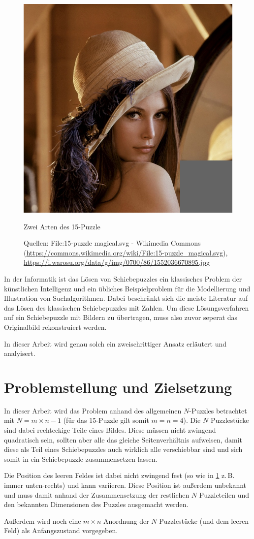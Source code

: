 \documentclass{whswinvcbook}
\begin{document}
\begin{figure}[H]
{        \includegraphics[width=0.25\linewidth]{img/fig-15-puzzle-image-solved.png}
    }
    \caption{Zwei Arten des 15-Puzzle}
    \caption*{Quellen: File:15-puzzle magical.svg - Wikimedia Commons (\url{https://commons.wikimedia.org/wiki/File:15-puzzle_magical.svg}), \url{https://i.warosu.org/data/g/img/0700/86/1552036670895.jpg}}
    \label{fig-15-puzzle}
\end{figure}
In der Informatik ist das Lösen von Schiebepuzzles ein klassisches Problem der künstlichen Intelligenz und ein übliches Beispielproblem für die Modellierung und Illustration von Suchalgorithmen. Dabei beschränkt sich die meiste Literatur auf das Lösen des klassischen Schiebepuzzles mit Zahlen. Um diese Lösungsverfahren auf ein Schiebepuzzle mit Bildern zu übertragen, muss also zuvor seperat das Originalbild rekonstruiert werden.

In dieser Arbeit wird genau solch ein zweischrittiger Ansatz erläutert und analyisert.
\section{Problemstellung und Zielsetzung}
In dieser Arbeit wird das Problem anhand des allgemeinen $N$-Puzzles betrachtet mit $N=m\times n-1$ (für das 15-Puzzle gilt somit $m=n=4$).
Die $N$ Puzzlestücke sind dabei rechteckige Teile eines Bildes. Diese müssen nicht zwingend quadratisch sein, sollten aber alle das gleiche Seitenverhältnis aufweisen, damit diese als Teil eines Schiebepuzzles auch wirklich alle verschiebbar sind und sich somit in ein Schiebepuzzle zusammensetzen lassen.

Die Position des leeren Feldes ist dabei nicht zwingend fest (so wie in \ref{fig-15-puzzle} z.\,B. immer unten-rechts) und kann variieren. Diese Position ist außerdem unbekannt und muss damit anhand der Zusammensetzung der restlichen $N$ Puzzleteilen und den bekannten Dimensionen des Puzzles ausgemacht werden.

Außerdem wird noch eine $m\times n$ Anordnung der $N$ Puzzlestücke (und dem leeren Feld) als Anfangszustand vorgegeben.
\end{document}
